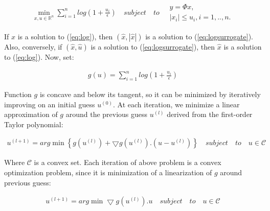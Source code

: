 \begin{equation}
\label{eq:logsurrogate}
\begin{gathered}
\min_{x,u\in \mathbb{R}^{n}}
\sum_{i=1}^{n} log(1+\frac{u_{i}}{\epsilon })
\quad subject \quad to \quad \begin{matrix}
y=\Phi x,\\
\left | x_{i} \right | \leq u_{i}, i=1,..,n.
\end{matrix}
\end{gathered}
\end{equation}

If $\hat{x}$ is a solution to (\ref{eq:log}), then $(\hat{x},\left | \hat{x}  \right |)$ is a solution to (\ref{eq:logsurrogate}). Also, conversely, if $(\hat{x},\hat{u})$ is a solution to (\ref{eq:logsurrogate}), then $\hat{x}$ is a solution to (\ref{eq:log}). Now, set:

\begin{equation}
\label{eq:funcg}
\begin{gathered}
g\left ( u \right ) =
\sum_{i=1}^{n} log(1+\frac{u_{i}}{\epsilon })
\end{gathered}
\end{equation}

Function $g$ is concave and below its tangent, so it can be minimized by iteratively improving on an initial guess $u^{\left ( 0 \right )}$.
At each iteration, we minimize a linear approximation of $g$ around the previous guess $u^{\left ( l \right )}$ derived from the first-order Taylor polynomial:

\begin{equation}
\begin{gathered}
u^{\left ( l+1 \right )} = arg \min\left \{ g\left ( u^{\left ( l \right )} \right ) + \bigtriangledown g\left ( u^{\left ( l \right )} \right ).\left ( u-u^{\left ( l \right )} \right ) \right \}
\quad subject \quad to \quad u\in \mathcal{C}
\end{gathered}
\end{equation}

Where $\mathcal{C}$ is a convex set. Each iteration of above problem is a convex optimization problem, since it is minimization of a linearization of $g$ around previous guess:

\begin{equation}
\begin{gathered}
u^{\left ( l+1 \right )} = arg \min \bigtriangledown g\left ( u^{\left ( l \right )} \right ).u
\quad subject \quad to \quad u\in \mathcal{C}
\end{gathered}
\end{equation}

